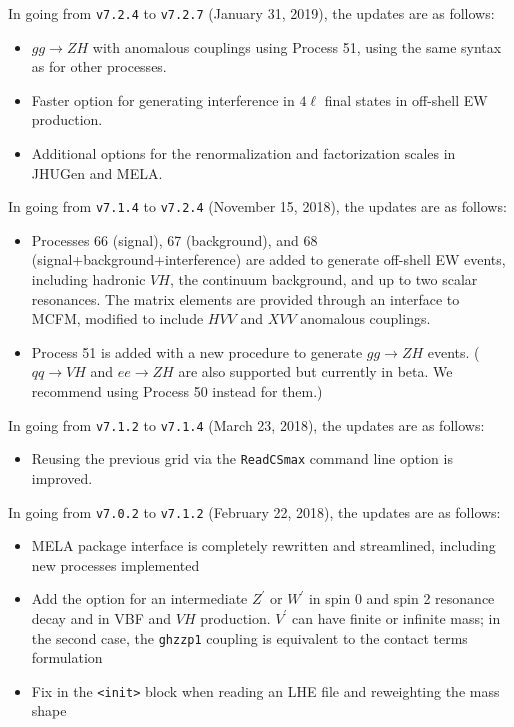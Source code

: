 \documentclass[aps,superscriptaddress,nofootinbib]{revtex4}
\begin{document}
\noindent
%
In going from \verb|v7.2.4| to \verb|v7.2.7| (January 31, 2019), the updates are as follows:
\begin{itemize}
\item $gg\to ZH$ with anomalous couplings using Process 51, using the same syntax as for other processes.
\item Faster option for generating interference in \(4\ell\) final states in off-shell EW production.
\item Additional options for the renormalization and factorization scales in JHUGen and MELA.
\end{itemize}
\noindent
In going from \verb|v7.1.4| to \verb|v7.2.4| (November 15, 2018), the updates are as follows:
\begin{itemize}
\item Processes 66 (signal), 67 (background), and 68 (signal+background+interference) are added to generate off-shell EW events, including hadronic $VH$, the continuum background, and up to two scalar resonances.  The matrix elements are provided through an interface to MCFM, modified to include $HVV$ and $XVV$ anomalous couplings.
\item Process 51 is added with a new procedure to generate $gg \to ZH$ events.  ($qq\to VH$ and $ee\to ZH$ are also supported but currently in beta.  We recommend using Process 50 instead for them.)
\end{itemize}
\noindent
In going from \verb|v7.1.2| to \verb|v7.1.4| (March 23, 2018), the updates are as follows:
\begin{itemize}
\item Reusing the previous grid via the \verb|ReadCSmax| command line option is improved.
\end{itemize}
\noindent
In going from \verb|v7.0.2| to \verb|v7.1.2| (February 22, 2018), the updates are as follows:
\begin{itemize}
\item MELA package interface is completely rewritten and streamlined, including new processes implemented
\item Add the option for an intermediate $Z^\prime$ or $W^\prime$ in spin 0 and spin 2 resonance decay and in VBF and $VH$ production.  $V^\prime$ can have finite or infinite mass; in the second case, the \verb|ghzzp1| coupling is equivalent to the contact terms formulation~\cite{Gonzalez-Alonso:2014eva}
\item Fix in the \verb|<init>| block when reading an LHE file and reweighting the mass shape
\end{itemize}
\end{document}
